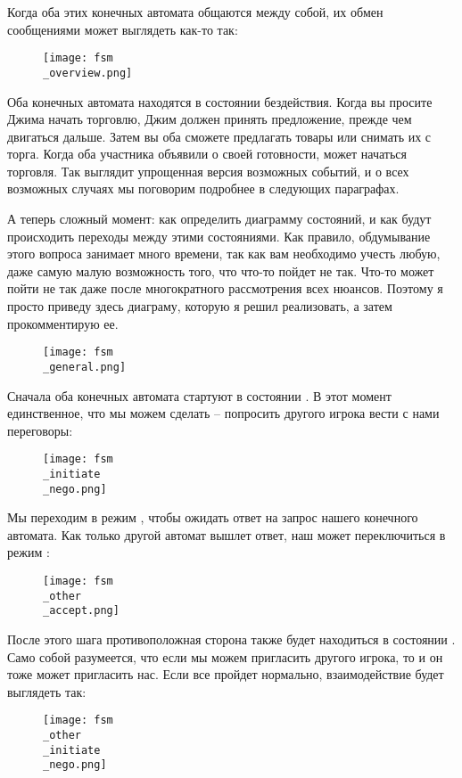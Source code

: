 Когда оба этих конечных автомата общаются между собой, их обмен сообщениями может выглядеть как-то так:

\begin{figure}[h!]
    \centering
    \texttt{[image: fsm\\\_overview.png]}
\end{figure}

Оба конечных автомата находятся в состоянии бездействия.
Когда вы просите Джима начать торговлю, Джим должен принять предложение, прежде чем двигаться дальше.
Затем вы оба сможете предлагать товары или снимать их с торга.
Когда оба участника объявили о своей готовности, может начаться торговля.
Так выглядит упрощенная версия возможных событий, и о всех возможных случаях мы поговорим подробнее в следующих параграфах.

А теперь сложный момент: как определить диаграмму состояний, и как будут происходить переходы между этими состояниями.
Как правило, обдумывание этого вопроса занимает много времени, так как вам необходимо учесть любую, даже самую малую возможность того, что что-то пойдет не так.
Что-то может пойти не так даже после многократного рассмотрения всех нюансов.
Поэтому я просто приведу здесь диаграму, которую я решил реализовать, а затем прокомментирую ее.

\begin{figure}[h!]
    \centering
    \texttt{[image: fsm\\\_general.png]}
\end{figure}

Сначала оба конечных автомата стартуют в состоянии .
В этот момент единственное, что мы можем сделать \--- попросить другого игрока вести с нами переговоры:

\begin{figure}[h!]
    \centering
    \texttt{[image: fsm\\\_initiate\\\_nego.png]}
\end{figure}

Мы переходим в режим , чтобы ожидать ответ на запрос нашего конечного автомата.
Как только другой автомат вышлет ответ, наш может переключиться в режим :

\begin{figure}[h!]
    \centering
    \texttt{[image: fsm\\\_other\\\_accept.png]}
\end{figure}

После этого шага противоположная сторона также будет находиться в состоянии .
Само собой разумеется, что если мы можем пригласить другого игрока, то и он тоже может пригласить нас.
Если все пройдет нормально, взаимодействие будет выглядеть так:

\begin{figure}[h!]
    \centering
    \texttt{[image: fsm\\\_other\\\_initiate\\\_nego.png]}
\end{figure}
